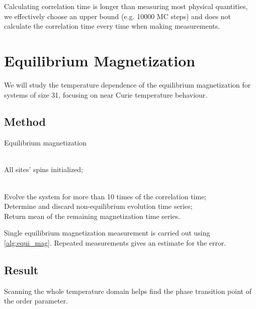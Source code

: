 \documentclass[%
showkeys,
bibnotes,
amsmath,amssymb,
floatfix,
]{revtex4-1}
\begin{document}
Calculating correlation time is longer than measuring most physical quantities, we effectively choose an upper bound (e.g. 10000 MC steps) and does not calculate the correlation time every time when making measurements.

\section{\label{sec:level1}Equilibrium Magnetization}

We will study the temperature dependence of the equilibrium magnetization for systems of size 31, focusing on near Curie temperature behaviour.

\subsection{\label{sec:level2}Method}

\begin{algorithm}[H]
	\caption{Equilibrium magnetization}
	\label{alg:equi_mag}
	\begin{algorithmic}
		\REQUIRE ~~\\
		
		All sites' spins initialized;\\
		\label{code:equi_mag:initialize}
		
		\ENSURE ~~\\
		
		Evolve the system for more than 10 times of the correlation time;\\
		\label{code:equi_mag:evolve}
		Determine and discard non-equilibrium evolution time series;\\
		\label{code:equi_mag:discard_non_equi}
		Return mean of the remaining magnetization time series.
	\end{algorithmic}
\end{algorithm}

Single equilibrium magnetization measurement is carried out using \ref{alg:equi_mag}. Repeated measurements gives an estimate for the error.

\subsection{\label{sec:level2}Result}

Scanning the whole temperature domain helps find the phase transition point of the order parameter.
\end{document}
